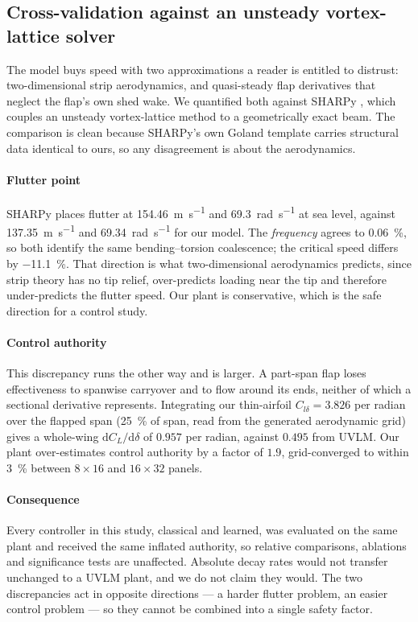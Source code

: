 \documentclass[preprint,11pt,authoryear]{elsarticle}
\begin{document}
\subsection{Cross-validation against an unsteady vortex-lattice solver}
\label{sec:sharpy}

The model buys speed with two approximations a reader is entitled to distrust:
two-dimensional strip aerodynamics, and quasi-steady flap derivatives that
neglect the flap's own shed wake. We quantified both against SHARPy
\citep{delcarre2019sharpy}, which couples an unsteady vortex-lattice method
\citep{murua2012uvlm} to a geometrically exact beam. The comparison is clean
because SHARPy's own Goland template carries structural data identical to ours,
so any disagreement is about the aerodynamics.

\paragraph{Flutter point}
SHARPy places flutter at \SI{154.46}{\metre\per\second} and
\SI{69.3}{\radian\per\second} at sea level, against
\SI{137.35}{\metre\per\second} and \SI{69.34}{\radian\per\second} for our model.
The \emph{frequency} agrees to \SI{0.06}{\percent}, so both identify the same
bending--torsion coalescence; the critical speed differs by \SI{-11.1}{\percent}.
That direction is what two-dimensional aerodynamics predicts, since strip theory
has no tip relief, over-predicts loading near the tip and therefore
under-predicts the flutter speed. Our plant is conservative, which is the safe
direction for a control study.

\paragraph{Control authority}
This discrepancy runs the other way and is larger. A part-span flap loses
effectiveness to spanwise carryover and to flow around its ends, neither of which
a sectional derivative represents. Integrating our thin-airfoil
$C_{l\delta}=3.826$ per radian over the flapped span (\SI{25}{\percent} of span,
read from the generated aerodynamic grid) gives a whole-wing
$\mathrm{d}C_L/\mathrm{d}\delta$ of $0.957$ per radian, against $0.495$ from
UVLM. Our plant over-estimates control authority by a factor of $1.9$,
grid-converged to within \SI{3}{\percent} between $8{\times}16$ and
$16{\times}32$ panels.

\paragraph{Consequence}
Every controller in this study, classical and learned, was evaluated on the same
plant and received the same inflated authority, so relative comparisons,
ablations and significance tests are unaffected. Absolute decay rates would not
transfer unchanged to a UVLM plant, and we do not claim they would. The two
discrepancies act in opposite directions --- a harder flutter problem, an easier
control problem --- so they cannot be combined into a single safety factor.
\end{document}
